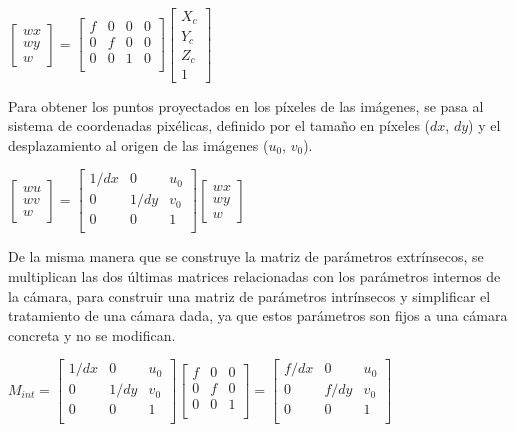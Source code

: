 \begin{center}
$
\begin{bmatrix} wx \\ wy \\ w \end{bmatrix}
=
\begin{bmatrix}
f & 0 & 0 & 0 \\
0 & f & 0 & 0 \\
0 & 0 & 1 & 0 \\
\end{bmatrix}
\begin{bmatrix} X_c \\ Y_c \\ Z_c \\ 1 \end{bmatrix}
$
\end{center}

Para obtener los puntos proyectados en los píxeles de las imágenes, se pasa al sistema de coordenadas pixélicas, definido por el tamaño en píxeles ($dx$, $dy$) y el desplazamiento al origen de las imágenes ($u_0$, $v_0$).

\begin{center}
$
\begin{bmatrix} wu \\ wv \\ w \end{bmatrix}
=
\begin{bmatrix}
1/dx & 0 & u_0 \\
0 & 1/dy & v_0 \\
0 & 0 & 1 \\
\end{bmatrix}
\begin{bmatrix} wx \\ wy \\ w \end{bmatrix}
$
\end{center}

De la misma manera que se construye la matriz de parámetros extrínsecos, se multiplican las dos últimas matrices relacionadas con los parámetros internos de la cámara, para construir una matriz de parámetros intrínsecos y simplificar el tratamiento de una cámara dada, ya que estos parámetros son fijos a una cámara concreta y no se modifican.

\begin{center}
$
M_{int}
=
\begin{bmatrix}
1/dx & 0 & u_0 \\
0 & 1/dy & v_0 \\
0 & 0 & 1 \\
\end{bmatrix}
\begin{bmatrix}
f & 0 & 0 \\
0 & f & 0 \\
0 & 0 & 1 \\
\end{bmatrix}
=
\begin{bmatrix}
f/dx & 0 & u_0 \\
0 & f/dy & v_0 \\
0 & 0 & 1 \\
\end{bmatrix}
$
\end{center}

